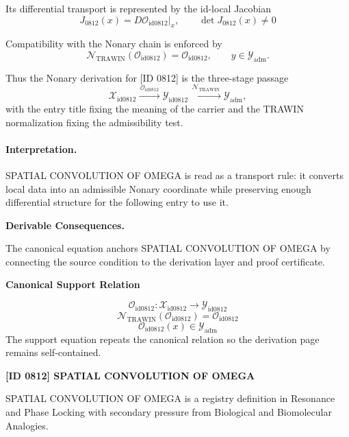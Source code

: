 Its differential transport is represented by the id-local Jacobian\[
J_{0812}(x)=D\mathcal{O}_{\mathrm{id0812}}\big|_x,\qquad \det J_{0812}(x)\neq 0
\]

Compatibility with the Nonary chain is enforced by\[
\mathcal{N}_{\mathrm{TRAWIN}}(\mathcal{O}_{\mathrm{id0812}})=\mathcal{O}_{\mathrm{id0812}},\qquad y\in\mathcal{Y}_{\mathrm{adm}}.
\]

Thus the Nonary derivation for [ID 0812] is the three-stage passage
\[
\mathcal{X}_{\mathrm{id0812}}\xrightarrow{\,\mathcal{O}_{\mathrm{id0812}}\,} \mathcal{Y}_{\mathrm{id0812}}\xrightarrow{\,\mathcal{N}_{\mathrm{TRAWIN}}\,} \mathcal{Y}_{\mathrm{adm}},
\]
with the entry title fixing the meaning of the carrier and the TRAWIN normalization fixing the admissibility test.

\paragraph{Interpretation.} SPATIAL CONVOLUTION OF OMEGA is read as a transport rule: it converts local data into an admissible Nonary coordinate while preserving enough differential structure for the following entry to use it.

\par\vspace{0.35em}
\noindent\textbf{Derivable Consequences.}\quad
\begingroup
\footnotesize
\raggedright
The canonical equation anchors SPATIAL CONVOLUTION OF OMEGA by connecting the source condition to the derivation layer and proof certificate.
\par\endgroup

\noindent\textbf{Canonical Support Relation}\par
\[
\mathcal{O}_{\mathrm{id0812}}:\mathcal{X}_{\mathrm{id0812}}\longrightarrow\mathcal{Y}_{\mathrm{id0812}}
\]
\[
\mathcal{N}_{\mathrm{TRAWIN}}(\mathcal{O}_{\mathrm{id0812}})=\mathcal{O}_{\mathrm{id0812}}
\]
\[
\mathcal{O}_{\mathrm{id0812}}(x)\in\mathcal{Y}_{\mathrm{adm}}
\]
\noindent The support equation repeats the canonical relation so the derivation page remains self-contained.\par

\clearpage
\noindent\textbf{[ID 0812] SPATIAL CONVOLUTION OF OMEGA}\par
\vspace{0.35em}
\begingroup\small
{}
SPATIAL CONVOLUTION OF OMEGA is a registry definition in Resonance and Phase Locking with secondary pressure from Biological and Biomolecular Analogies.

